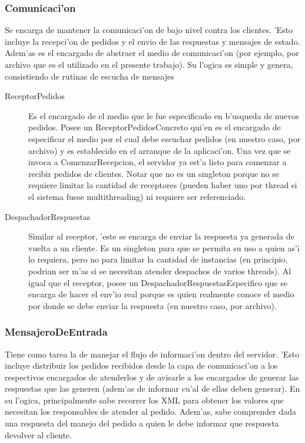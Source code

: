 \subsubsection{Comunicaci'on}
Se encarga de mantener la comunicaci'on de bajo nivel contra los clientes. 'Esto incluye la recepci'on de pedidos y el envio de las respuestas y mensajes de estado. Adem'as es el encargado de abstraer el medio de comunicaci'on (por ejemplo, por archivo que es el utilizado en el presente trabajo). Su l'ogica es simple y genera, consistiendo de rutinas de escucha de mensajes


\begin{description}
\item[ReceptorPedidos] Es el encargado de  el medio que le fue especificado en b'usqueda de nuevos pedidos. Posee un ReceptorPedidosConcreto qui'en es el encargado de especificar el medio por el cual debe escuchar pedidos (en nuestro caso, por archivo) y es establecido en el arranque de la aplicaci'on. Una vez que se invoca a ComenzarRecepcion, el servidor ya est'a listo para comenzar a recibir pedidos de clientes. Notar que no es un singleton porque no se requiere limitar la cantidad de receptores (pueden haber uno por thread si el sistema fuese multithreading) ni requiere ser referenciado. 
\item[DespachadorRespuestas] Similar al receptor, 'este se encarga de enviar la respuesta ya generada de vuelta a un cliente. Es un singleton para que se permita su uso a quien as'i lo requiera, pero no para limitar la cantidad de instancias (en principio, podrian ser m'as si se necesitan atender despachos de varios threads). Al igual que el receptor, posee un DespachadorRespuestasEspecifico que se encarga de hacer el env'io real porque es quien realmente conoce el medio por donde se debe enviar la respuesta (en nuestro caso, por archivo).
\end{description}


\subsubsection{MensajeroDeEntrada}
Tiene como tarea la de manejar el flujo de informaci'on dentro del servidor. 'Esto incluye distribuir los pedidos recibidos desde la capa de comunicaci'on a los respectivos encargados de atenderlos y de avisarle a los encargados de generar las respuestas que las generen (adem'as de informar cu'al de ellas deben generar). En su l'ogica, principalmente sabe recorrer los XML para obtener los valores que necesitan los responsables de atender al pedido. Adem'as, sabe comprender dada una respuesta del manejo del pedido a quien le debe informar que respuesta devolver al cliente.

